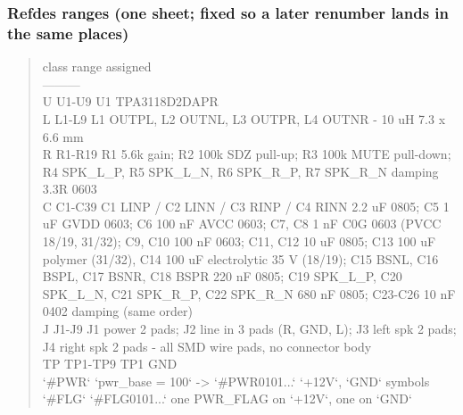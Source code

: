 \documentclass[11pt,a4paper]{article}
\begin{document}
\subsubsection*{Refdes ranges (one sheet; fixed so a later renumber lands in the same places)}
\begin{quote}\small\ttfamily\raggedright
\textbar{} class \textbar{} range \textbar{} assigned \textbar{}\\
\textbar{}---\textbar{}---\textbar{}---\textbar{}\\
\textbar{} U \textbar{} U1-U9 \textbar{} U1 TPA3118D2DAPR \textbar{}\\
\textbar{} L \textbar{} L1-L9 \textbar{} L1 OUTPL, L2 OUTNL, L3 OUTPR, L4 OUTNR - 10 uH 7.3 x 6.6 mm \textbar{}\\
\textbar{} R \textbar{} R1-R19 \textbar{} R1 5.6k gain; R2 100k SDZ pull-up; R3 100k MUTE pull-down; R4 SPK\_L\_P, R5 SPK\_L\_N, R6 SPK\_R\_P, R7 SPK\_R\_N damping 3.3R 0603 \textbar{}\\
\textbar{} C \textbar{} C1-C39 \textbar{} C1 LINP / C2 LINN / C3 RINP / C4 RINN 2.2 uF 0805; C5 1 uF GVDD 0603; C6 100 nF AVCC 0603; C7, C8 1 nF C0G 0603 (PVCC 18/19, 31/32); C9, C10 100 nF 0603; C11, C12 10 uF 0805; C13 100 uF polymer (31/32), C14 100 uF electrolytic 35 V (18/19); C15 BSNL, C16 BSPL, C17 BSNR, C18 BSPR 220 nF 0805; C19 SPK\_L\_P, C20 SPK\_L\_N, C21 SPK\_R\_P, C22 SPK\_R\_N 680 nF 0805; C23-C26 10 nF 0402 damping (same order) \textbar{}\\
\textbar{} J \textbar{} J1-J9 \textbar{} J1 power 2 pads; J2 line in 3 pads (R, GND, L); J3 left spk 2 pads; J4 right spk 2 pads - all SMD wire pads, no connector body \textbar{}\\
\textbar{} TP \textbar{} TP1-TP9 \textbar{} TP1 GND \textbar{}\\
\textbar{} `\#PWR` \textbar{} `pwr\_base = 100` -\textgreater{} `\#PWR0101...` \textbar{} `+12V`, `GND` symbols \textbar{}\\
\textbar{} `\#FLG` \textbar{} `\#FLG0101...` \textbar{} one PWR\_FLAG on `+12V`, one on `GND` \textbar{}
\end{quote}
\end{document}
